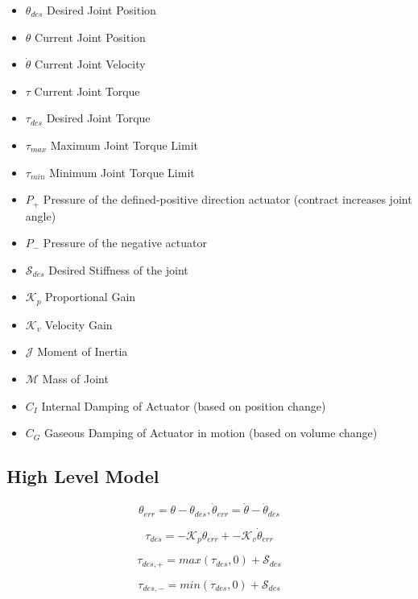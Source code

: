 \documentclass[12pt, letterpaper, oneside, notitlepage, onecolumn]{article}
\newcommand{\bbss}[1]{\subsection{#1}}
\begin{document}
\begin{itemize}
\item $\theta_{des}$ Desired Joint Position
\item $\theta$ Current Joint Position
\item $\dot{\theta}$ Current Joint Velocity
\item $\tau$ Current Joint Torque
\item $\tau_{des}$ Desired Joint Torque
\item $\tau_{max}$ Maximum Joint Torque Limit
\item $\tau_{min}$ Minimum Joint Torque Limit
\item $P_{+}$ Pressure of the defined-positive direction actuator (contract
increases joint angle)
\item $P_{-}$ Pressure of the negative actuator

\item $\mathcal{S}_{des}$ Desired Stiffness of the joint
\item $\mathcal{K}_{p}$ Proportional Gain
\item $\mathcal{K}_{v}$ Velocity Gain

\item $\mathcal{J}$ Moment of Inertia
\item $\mathcal{M}$ Mass of Joint
\item $C_{I}$ Internal Damping of Actuator (based on position change)
\item $C_{G}$ Gaseous Damping of Actuator in motion (based on volume change)
\end{itemize}

\bbss{High Level Model}

\begin{equation}
\theta_{err} = \theta - \theta_{des},
\dot{\theta}_{err} = \dot{\theta} - \dot{\theta}_{des}
\end{equation}

\begin{equation}
\tau_{des} = -\mathcal{K}_{p} \theta_{err} + -\mathcal{K}_{v} \dot{\theta}_{err}
\end{equation}

\begin{equation}
\tau_{des, +} = max(\tau_{des}, 0) + \mathcal{S}_{des}
\end{equation}

\begin{equation}
\tau_{des, -} = min(\tau_{des}, 0) + \mathcal{S}_{des}
\end{equation}
\end{document}
